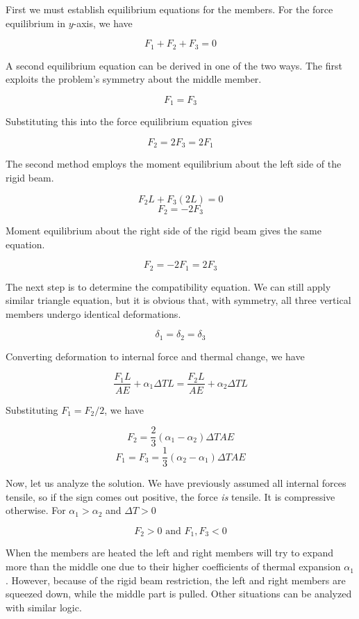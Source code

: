 \documentclass[
10pt,
a4paper,
openany,
svgnames,
]{kaobook} %
\begin{document}
\begin{solution}
  First we must establish equilibrium equations for the members. For the force equilibrium in $y$-axis, we have

  $$ F_1 + F_2 + F_3 = 0 $$

  A second equilibrium equation can be derived in one of the two ways. The first exploits the problem's symmetry about the middle member.

  $$ F_1 = F_3 $$

  Substituting this into the force equilibrium equation gives

  $$ F_2 = 2F_3 = 2F_1 $$
  
  The second method employs the moment equilibrium about the left side of the rigid beam.

  $$ F_2 L + F_3 (2L) = 0 $$
  $$ F_2 = -2F_3 $$

  Moment equilibrium about the right side of the rigid beam gives the same equation.

  $$ F_2 = -2F_1 = 2F_3 $$

  The next step is to determine the compatibility equation. We can still apply similar triangle equation, but it is obvious that, with symmetry, all three vertical members undergo identical deformations. 

  $$ \delta_1 = \delta_2 = \delta_3 $$

  Converting deformation to internal force and thermal change, we have

  $$ \frac{F_1 L}{AE} + \alpha_1 \Delta TL = \frac{F_2 L}{AE} + \alpha_2 \Delta TL $$ 

  Substituting $F_1 = F_2 / 2$, we have

  $$ F_2 = \frac{2}{3} \left( \alpha_1 - \alpha_2 \right) \Delta T A E $$
  $$ F_1 = F_3 = \frac{1}{3} \left( \alpha_2 - \alpha_1 \right) \Delta T A E $$

  Now, let us analyze the solution. We have previously assumed all internal forces tensile, so if the sign comes out positive, the force \emph{is} tensile. It is compressive otherwise. For $\alpha_1 > \alpha_2$ and $\Delta T > 0$

  $$ F_2 > 0 \text{ and } F_1, F_3 < 0 $$

  When the members are heated the left and right members will try to expand more than the middle one due to their higher coefficients of thermal expansion $\alpha_1$. However, because of the rigid beam restriction, the left and right members are squeezed down, while the middle part is pulled. Other situations can be analyzed with similar logic.
\end{solution}
\end{document}
